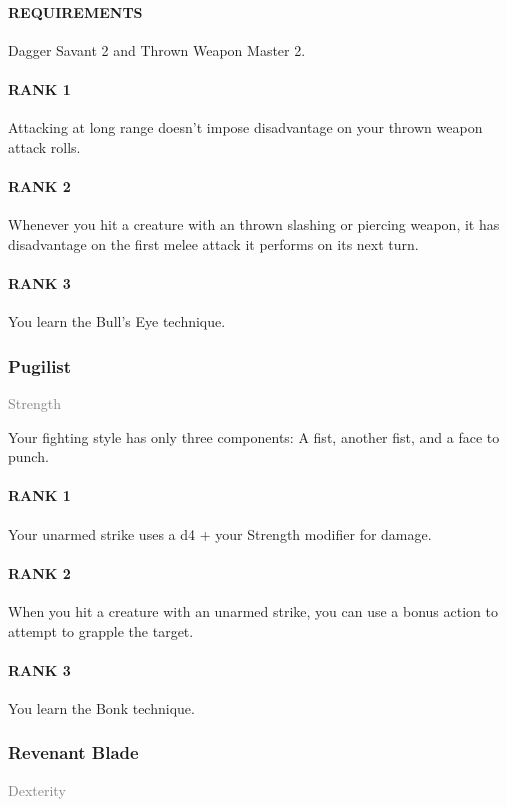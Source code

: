 \paragraph{REQUIREMENTS} Dagger Savant 2 and Thrown Weapon Master 2.
\paragraph{RANK 1} Attacking at long range doesn't impose disadvantage on your thrown weapon attack rolls.
\paragraph{RANK 2} Whenever you hit a creature with an thrown slashing or piercing weapon, it has disadvantage on the first melee attack it performs on its next turn.
\paragraph{RANK 3} You learn the Bull's Eye technique.

\subsubsection{Pugilist} \label{feat::pugilist}
\small{\textcolor{gray}{Strength}}

\normalsize
Your fighting style has only three components:
A fist, another fist, and a face to punch.
\paragraph{RANK 1} Your unarmed strike uses a d4 + your Strength modifier for damage.
\paragraph{RANK 2} When you hit a creature with an unarmed strike, you can use a bonus action to attempt to grapple the target.
\paragraph{RANK 3} You learn the Bonk technique.

\subsubsection{Revenant Blade} \label{feat::revenantblade}
\small{\textcolor{gray}{Dexterity}}


